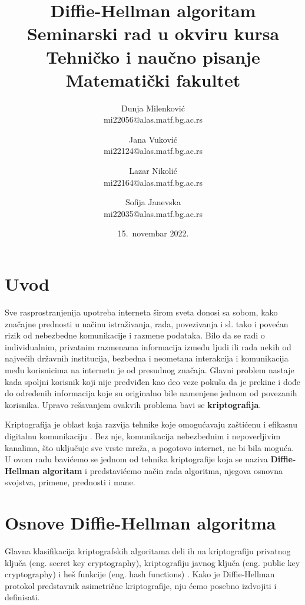\documentclass[a4paper]{article}
\begin{document}
\title{Diffie-Hellman algoritam\\ \small{Seminarski rad u okviru kursa\\Tehničko i naučno pisanje\\ Matematički fakultet}}

\author{Dunja Milenković\\ mi22056@alas.matf.bg.ac.rs\and Jana Vuković\\mi22124@alas.matf.bg.ac.rs\and Lazar Nikolić\\mi22164@alas.matf.bg.ac.rs\and Sofija Janevska\\mi22035@alas.matf.bg.ac.rs }
\date{15.~novembar 2022.}
\maketitle


\tableofcontents

\newpage

\section{Uvod}
\label{sec:uvod}
Sve rasprostranjenija upotreba interneta širom sveta donosi sa sobom, kako značajne prednosti u načinu istraživanja, rada, povezivanja i sl. tako i povećan rizik od nebezbedne komunikacije i razmene podataka. Bilo da se radi o individualnim, privatnim razmenama informacija između ljudi ili rada nekih od najvećih državnih institucija, bezbedna i neometana interakcija i komunikacija među korisnicima na internetu je od presudnog značaja. Glavni problem nastaje kada spoljni korisnik koji nije predviđen kao deo veze pokuša da je prekine i dođe do određenih informacija koje su originalno bile namenjene jednom od povezanih korisnika. Upravo rešavanjem ovakvih problema bavi se \textbf{kriptografija}.

Kriptografija je oblast koja razvija tehnike koje omogućavaju zaštićenu i efikasnu digitalnu komunikaciju \cite{cryptography}. Bez nje, komunikacija nebezbednim i nepoverljivim kanalima, što uključuje sve vrste mreža, a pogotovo internet, ne bi bila moguća. U ovom radu bavićemo se jednom od tehnika kriptografije koja se naziva \textbf{Diffie-Hellman algoritam} %
i predstavićemo način rada algoritma, njegova osnovna svojstva, primene, prednosti i mane.

\section{Osnove Diffie-Hellman algoritma}
Glavna klasifikacija kriptografskih algoritama deli ih na kriptografiju privatnog ključa (eng. secret key cryptography), kriptografiju javnog ključa (eng. public key cryptography) i heš funkcije (eng. hash functions) \cite{cryptography}. Kako je Diffie-Hellman protokol predstavnik asimetrične kriptografije, nju ćemo posebno izdvojiti i definisati.
\end{document}
